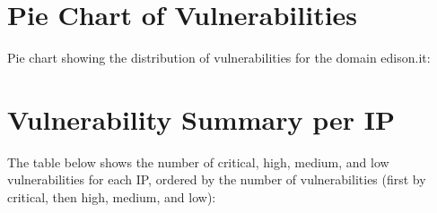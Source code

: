 \documentclass{article}
\begin{document}
\clearpage

\section{Pie Chart of Vulnerabilities}

\noindent Pie chart showing the distribution of vulnerabilities for the domain \ttfamily edison.it:


\begin{figure}[H]
    \centering
\end{figure}


\clearpage

\section{Vulnerability Summary per IP}

\noindent The table below shows the number of critical, high, medium, and low vulnerabilities for each IP, ordered by the number of vulnerabilities (first by critical, then high, medium, and low):
\end{document}
